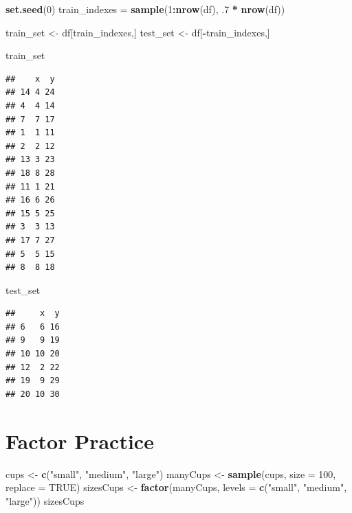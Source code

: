 \documentclass[]{book}
\newenvironment{Shaded}{\begin{snugshade}}{\end{snugshade}}
\newcommand{\DataTypeTok}[1]{\textcolor[rgb]{0.13,0.29,0.53}{#1}}
\newcommand{\DecValTok}[1]{\textcolor[rgb]{0.00,0.00,0.81}{#1}}
\newcommand{\FloatTok}[1]{\textcolor[rgb]{0.00,0.00,0.81}{#1}}
\newcommand{\KeywordTok}[1]{\textcolor[rgb]{0.13,0.29,0.53}{\textbf{#1}}}
\newcommand{\NormalTok}[1]{#1}
\newcommand{\OperatorTok}[1]{\textcolor[rgb]{0.81,0.36,0.00}{\textbf{#1}}}
\newcommand{\OtherTok}[1]{\textcolor[rgb]{0.56,0.35,0.01}{#1}}
\newcommand{\StringTok}[1]{\textcolor[rgb]{0.31,0.60,0.02}{#1}}
\begin{document}
\begin{Shaded}
\begin{Highlighting}[]
\KeywordTok{set.seed}\NormalTok{(}\DecValTok{0}\NormalTok{)}
\NormalTok{train_indexes =}\StringTok{ }\KeywordTok{sample}\NormalTok{(}\DecValTok{1}\OperatorTok{:}\KeywordTok{nrow}\NormalTok{(df), }\FloatTok{.7} \OperatorTok{*}\StringTok{ }\KeywordTok{nrow}\NormalTok{(df))}

\NormalTok{train_set <-}\StringTok{ }\NormalTok{df[train_indexes,]}
\NormalTok{test_set <-}\StringTok{ }\NormalTok{df[}\OperatorTok{-}\NormalTok{train_indexes,]}

\NormalTok{train_set}
\end{Highlighting}
\end{Shaded}

\begin{verbatim}
##    x  y
## 14 4 24
## 4  4 14
## 7  7 17
## 1  1 11
## 2  2 12
## 13 3 23
## 18 8 28
## 11 1 21
## 16 6 26
## 15 5 25
## 3  3 13
## 17 7 27
## 5  5 15
## 8  8 18
\end{verbatim}

\begin{Shaded}
\begin{Highlighting}[]
\NormalTok{test_set}
\end{Highlighting}
\end{Shaded}

\begin{verbatim}
##     x  y
## 6   6 16
## 9   9 19
## 10 10 20
## 12  2 22
## 19  9 29
## 20 10 30
\end{verbatim}

\hypertarget{factorpractice}{%
\chapter{Factor Practice}\label{factorpractice}}

\begin{Shaded}
\begin{Highlighting}[]
\NormalTok{cups <-}\StringTok{ }\KeywordTok{c}\NormalTok{(}\StringTok{"small"}\NormalTok{, }\StringTok{"medium"}\NormalTok{, }\StringTok{"large"}\NormalTok{)}
\NormalTok{manyCups <-}\StringTok{ }\KeywordTok{sample}\NormalTok{(cups, }\DataTypeTok{size =} \DecValTok{100}\NormalTok{, }\DataTypeTok{replace =} \OtherTok{TRUE}\NormalTok{)}
\NormalTok{sizesCups <-}\StringTok{ }\KeywordTok{factor}\NormalTok{(manyCups, }\DataTypeTok{levels =} \KeywordTok{c}\NormalTok{(}\StringTok{"small"}\NormalTok{, }\StringTok{"medium"}\NormalTok{, }\StringTok{"large"}\NormalTok{))}
\NormalTok{sizesCups}
\end{Highlighting}
\end{Shaded}
\end{document}

